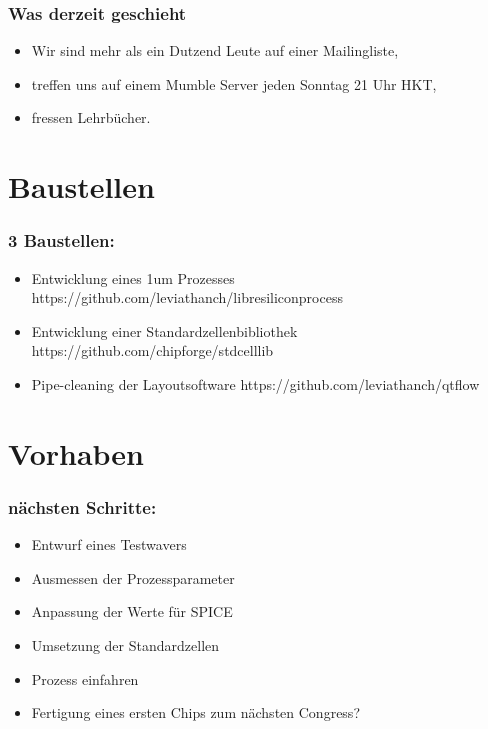 \documentclass{beamer}
\begin{document}
\begin{frame}
\frametitle{Was derzeit geschieht}
\begin{itemize}
\item Wir sind mehr als ein Dutzend Leute auf einer Mailingliste,
\item treffen uns auf einem Mumble Server jeden Sonntag 21 Uhr HKT,
\item fressen Lehrbücher.
\end{itemize}
\end{frame}

\section{Baustellen}

\begin{frame}
\frametitle{3 Baustellen:}
\begin{itemize}
\item Entwicklung eines 1um Prozesses
https://github.com/leviathanch/libresiliconprocess
\item Entwicklung einer Standardzellenbibliothek
https://github.com/chipforge/stdcelllib
\item Pipe-cleaning der Layoutsoftware
https://github.com/leviathanch/qtflow
\end{itemize}
\end{frame}


\section{Vorhaben}

\begin{frame}
\frametitle{nächsten Schritte:}
\begin{itemize}
\item Entwurf eines Testwavers
\item Ausmessen der Prozessparameter
\item Anpassung der Werte für SPICE
\item Umsetzung der Standardzellen
\item Prozess einfahren
\item Fertigung eines ersten Chips zum nächsten Congress?
\end{itemize}
\end{frame}
\end{document}
